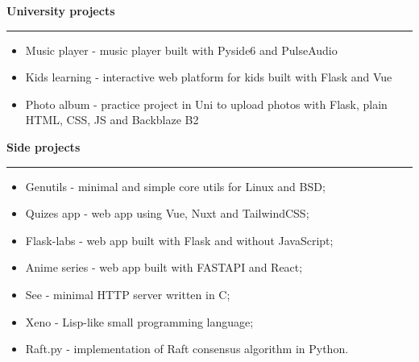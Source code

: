{
    {\vspace{0.5cm} \hspace{-0.5cm} \Large \textbf{University projects}}
    \par\noindent\rule{\textwidth}{0.1mm}
    \begin{itemize}
        \item {Music player - music player built with Pyside6 and PulseAudio}
        \item {Kids learning - interactive web platform for kids built with Flask and Vue}
        \item {
            Photo album - practice project in Uni to upload photos with Flask, 
            plain HTML, CSS, JS and Backblaze B2
        }
    \end{itemize}

    {\vspace{0.5cm} \hspace{-1cm} \Large \textbf{Side projects}}
    \par\noindent\rule{\textwidth}{0.1mm}
    \begin{itemize}
        \item {Genutils - minimal and simple core utils for Linux and BSD};
        \item {Quizes app - web app using Vue, Nuxt and TailwindCSS};
        \item {Flask-labs - web app built with Flask and without JavaScript};
        \item {Anime series - web app built with FASTAPI and React};
        \item {See - minimal HTTP server written in C};
        \item {Xeno - Lisp-like small programming language};
        \item {Raft.py - implementation of Raft consensus algorithm in Python}.
    \end{itemize}
}
